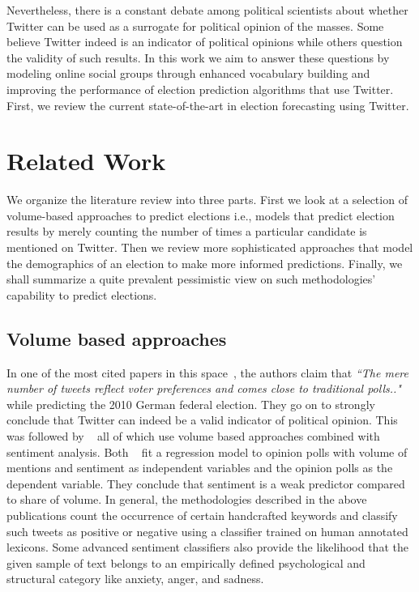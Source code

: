 Nevertheless, there is a constant debate among political scientists about whether Twitter can be 
used as a surrogate for political opinion of the masses.
Some believe Twitter indeed is an indicator of political opinions while others question the validity of such results.
In this work we aim to answer these questions by modeling online social groups through enhanced
vocabulary building and improving the performance of election prediction algorithms that use Twitter.
First, we review the current state-of-the-art in election forecasting using Twitter.

\section{Related Work}
We organize the literature review into three parts.
First we look at a selection of volume-based approaches to predict elections i.e., models that predict election 
results by merely counting the number of times a particular candidate is mentioned on Twitter.
Then we review more sophisticated approaches that model the demographics of an election to make more informed predictions.
Finally, we shall summarize a quite prevalent pessimistic view on such methodologies' capability to predict elections.

\subsection{Volume based approaches}
In one of the most cited papers in this space~\cite{tumasjan2010predicting}, the authors claim that 
\emph{``The mere number of tweets reflect voter preferences and comes close to  traditional polls.."}
while predicting  the 2010 German federal election. %
They go on to strongly conclude that Twitter can indeed be a valid indicator of political opinion.
This was followed by ~\cite{o2010tweets,saez2011total,bermingham2011using,demartini2011analyzing} all of which use volume based approaches combined with sentiment analysis.
Both ~\cite{o2010tweets,bermingham2011using} fit a regression model to opinion polls with volume of mentions and sentiment as independent variables and the opinion polls as the dependent variable. 
They conclude that sentiment is a weak predictor compared to share of volume.
In general, the methodologies described in the above publications count the occurrence of certain handcrafted 
keywords and classify such tweets as positive or negative using a classifier trained on human annotated lexicons.
Some advanced sentiment classifiers also provide the likelihood that the
given sample of text belongs to an empirically defined psychological and structural category like 
anxiety, anger, and sadness.


